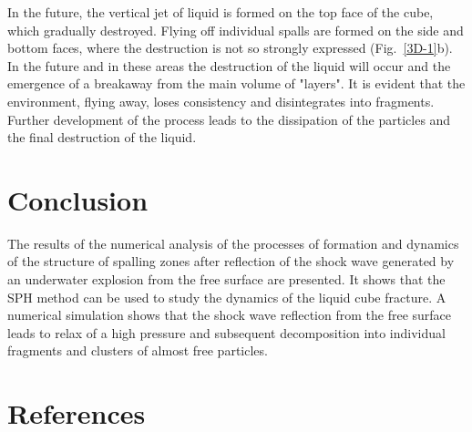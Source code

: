 \documentclass[a4paper]{jpconf}
\begin{document}
In the future, the vertical jet of liquid is formed on the top face of the cube, which gradually destroyed. Flying off individual spalls are formed on the side and bottom faces, where the destruction is not so strongly expressed (Fig.~\ref{3D-1}b).
In the future and in these areas the destruction of the liquid will occur and the emergence of a breakaway from the main volume of "layers". It is evident that the environment, flying away, loses consistency and disintegrates into fragments.
Further development of the process leads to the dissipation of the particles and the final destruction of the liquid.

\section{Conclusion}

The results of the numerical analysis of the processes of formation and dynamics of the structure of spalling zones after reflection of the shock wave generated by an underwater explosion from the free surface are presented. It shows that the SPH method can be used to study the dynamics of the liquid cube fracture.  A numerical simulation shows that the shock wave reflection from the free surface leads to relax of a high pressure and subsequent decomposition into individual fragments and clusters of almost free particles.


\section*{References}
%


\end{document}
